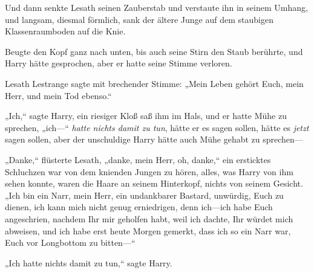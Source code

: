 Und dann senkte Lesath seinen Zauberstab und verstaute ihn in seinem Umhang, und langsam, diesmal förmlich, sank der ältere Junge auf dem staubigen Klassenraumboden auf die Knie.

Beugte den Kopf ganz nach unten, bis auch seine Stirn den Staub berührte, und Harry hätte gesprochen, aber er hatte seine Stimme verloren.

Lesath Lestrange sagte mit brechender Stimme: „Mein Leben gehört Euch, mein Herr, und mein Tod ebenso.“

„Ich,“ sagte Harry, ein riesiger Kloß saß ihm im Hals, und er hatte Mühe zu sprechen, „ich—“ \emph{hatte nichts damit zu tun}, hätte er es sagen sollen, hätte es \emph{jetzt} sagen sollen, aber der unschuldige Harry hätte auch Mühe gehabt zu sprechen—

„Danke,“ flüsterte Lesath, „danke, mein Herr, oh, danke,“ ein ersticktes Schluchzen war von dem knienden Jungen zu hören, alles, was Harry von ihm sehen konnte, waren die Haare an seinem Hinterkopf, nichts von seinem Gesicht. „Ich bin ein Narr, mein Herr, ein undankbarer Bastard, unwürdig, Euch zu dienen, ich kann mich nicht genug erniedrigen, denn ich—ich habe Euch angeschrien, nachdem Ihr mir geholfen habt, weil ich dachte, Ihr würdet mich abweisen, und ich habe erst heute Morgen gemerkt, dass ich so ein Narr war, Euch vor Longbottom zu bitten—“

„Ich hatte nichts damit zu tun,“ sagte Harry.

